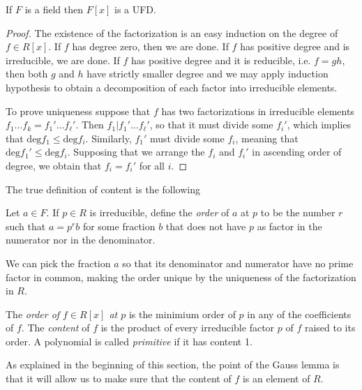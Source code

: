 \begin{lemma}
\label{lemma-polynomials-over-fields-are-UFD}
If $F$ is a field then $F[x]$ is a UFD.
\end{lemma}

\begin{proof}
The existence of the factorization is an easy induction on the degree of $f\in
R[x]$. If $f$ has degree zero, then we are done. If $f$ has positive degree and
is irreducible, we are done. If $f$ has positive degree and it is reducible,
i.e. $f=gh$, then both $g$ and $h$ have strictly smaller degree and we may apply
induction hypothesis to obtain a decomposition of each factor into irreducible
elements.

To prove uniqueness suppose that $f$ has two factorizations in irreducible
elements  $f_1\ldots f_k=f_1'\ldots f_\ell'$. Then $f_1|f_1'\ldots f_\ell'$, so
that it must divide some $f_i'$, which implies that 
$\text{deg}f_1 \leq\text{deg}f_i$. Similarly, $f_1'$ must divide some $f_i$,
meaning that $\text{deg}f_1'\leq \text{deg}f_i$. Supposing that we arrange the
$f_i$ and $f_i'$ in ascending order of degree, we obtain that $f_i=f_i'$ for all
$i$.
\end{proof}

The true definition of content is the following

\begin{definition}
\label{definition-order-of-fraction}
Let $a \in F$. If $p \in R$ is irreducible, define the {\it order} of $a$ at $p$
to be the number $r$ such that $a=p^rb$ for some fraction $b$ that does not have
$p$ as factor in the numerator nor in the denominator.
\end{definition}

We can pick the fraction $a$ so that its denominator and numerator have no prime
factor in common, making the order unique by the uniqueness of the factorization
in $R$.

\begin{definition}
\label{definition-content}
\begin{reference}
\cite[p. 181]{Lang-algebra}
\end{reference}
The {\it  order of $f\in R[x]$ at $p$} is the minimium order of
$p$ in any of the coefficients of $f$. The {\it content} of $f$ is the product
of every irreducible factor $p$ of $f$ raised to its order. A polynomial is
called {\it primitive} if it has content 1.
\end{definition}

As explained in the beginning of this section, the point of the Gauss
lemma is that it will allow us to make sure that the content of $f$ is an
element of $R$.

